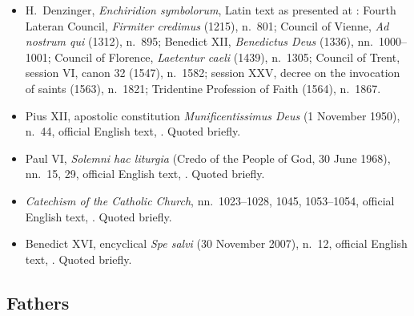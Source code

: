 {\fontsize{8.6}{9.6}\selectfont
\begin{itemize}[itemsep=0pt,parsep=0pt,topsep=0.05em]
\item H.~Denzinger, \emph{Enchiridion symbolorum}, Latin text as presented at : Fourth Lateran Council, \emph{Firmiter credimus} (1215), n.~801; Council of Vienne, \emph{Ad nostrum qui} (1312), n.~895; Benedict XII, \emph{Benedictus Deus} (1336), nn.~1000--1001; Council of Florence, \emph{Laetentur caeli} (1439), n.~1305; Council of Trent, session VI, canon 32 (1547), n.~1582; session XXV, decree on the invocation of saints (1563), n.~1821; Tridentine Profession of Faith (1564), n.~1867.
\item Pius XII, apostolic constitution \emph{Munificentissimus Deus} (1 November 1950), n.~44, official English text, . Quoted briefly.
\item Paul VI, \emph{Solemni hac liturgia} (Credo of the People of God, 30 June 1968), nn.~15, 29, official English text, . Quoted briefly.
\item \emph{Catechism of the Catholic Church}, nn.~1023--1028, 1045, 1053--1054, official English text, . Quoted briefly.
\item Benedict XVI, encyclical \emph{Spe salvi} (30 November 2007), n.~12, official English text, . Quoted briefly.
\end{itemize}}

\subsection*{Fathers}

